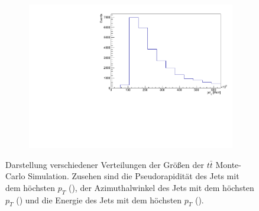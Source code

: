 \begin{figure}
\begin{subfigure}{0.5\textwidth}
    \includegraphics[width=\linewidth]{plots_and_txt/ttbar.mu_selected_/ttbar.mu_selected_jet_E.pdf}
    \caption{}
    \label{fig:jet_pt_good4}
  \end{subfigure}%
  \caption{Darstellung verschiedener Verteilungen der Größen der $t\bar{t}$ Monte-Carlo Simulation.
  Zusehen sind die Pseudorapidität des Jets mit dem höchsten $p_T$ (),  der Azimuthalwinkel des Jets mit dem höchsten $p_T$ () und die Energie des Jets mit dem höchsten $p_T$ ().
  }
  \label{fig:Distributions4}
\end{figure}

